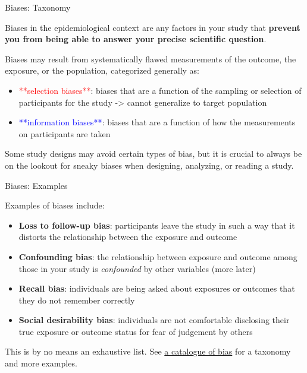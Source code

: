 \documentclass[ignorenonframetext,]{beamer}
\providecommand{\tightlist}{%
  \setlength{\itemsep}{0pt}\setlength{\parskip}{0pt}}
\begin{document}
\begin{frame}{Biases: Taxonomy}
\protect\hypertarget{biases-taxonomy}{}

Biases in the epidemiological context are any factors in your study that
\textbf{prevent you from being able to answer your precise scientific
question}.

Biases may result from systematically flawed measurements of the
outcome, the exposure, or the population, categorized generally as:

\begin{itemize}
\tightlist
\item
  \textcolor{red}{**selection biases**}: biases that are a function of
  the sampling or selection of participants for the study
  -\textgreater{} cannot generalize to target population
\item
  \textcolor{blue}{**information biases**}: biases that are a function
  of how the measurements on participants are taken
\end{itemize}

Some study designs may avoid certain types of bias, but it is crucial to
always be on the lookout for sneaky biases when designing, analyzing, or
reading a study.

\end{frame}

\begin{frame}{Biases: Examples}
\protect\hypertarget{biases-examples}{}

Examples of biases include:

\begin{itemize}
\tightlist
\item
  \textbf{Loss to follow-up bias}: participants leave the study in such
  a way that it distorts the relationship between the exposure and
  outcome
\item
  \textbf{Confounding bias}: the relationship between exposure and
  outcome among those in your study is \emph{confounded} by other
  variables (more later)
\item
  \textbf{Recall bias}: individuals are being asked about exposures or
  outcomes that they do not remember correctly
\item
  \textbf{Social desirability bias}: individuals are not comfortable
  disclosing their true exposure or outcome status for fear of judgement
  by others
\end{itemize}

This is by no means an exhaustive list. See
\href{https://catalogofbias.org/biases/}{a catalogue of bias} for a
taxonomy and more examples.

\end{frame}
\end{document}
